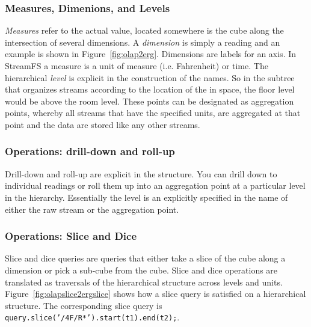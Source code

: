 \subsubsection{Measures, Dimenions, and Levels}
\emph{Measures} refer to the actual value, located somewhere is the cube along the intersection of several dimensions.
A \emph{dimension} is simply a reading and an example is shown in Figure~\ref{fig:olap2erg}.  Dimensions 
are labels for an axis.  In StreamFS a measure is a unit of measure (i.e. Fahrenheit) or time.  The hierarchical \emph{level}
is explicit in the construction of the names.  So in the subtree that organizes streams according to the location of the
in space, the floor level would be above the room level.  These points can be designated as aggregation points, whereby
all streams that have the specified units, are aggregated at that point and the data are stored like any other streams.

\subsubsection{Operations: drill-down and roll-up}
Drill-down and roll-up are explicit in the structure.  You can drill down to individual readings or roll them
up into an aggregation point at a particular level in the hierarchy.  Essentially the level is an explicitly specified in the 
name of either the raw stream or the aggregation point.

\subsubsection{Operations: Slice and Dice}
Slice and dice queries are queries that either take a slice of the cube along a dimension or pick a sub-cube from the cube.
Slice and dice operations are translated as traversals of the hierarchical structure across levels and units.  Figure~\ref{fig:olapslice2ergslice}
shows how a slice query is satisfied on a hierarchical structure.  The corresponding slice query 
is \texttt{query.slice('/4F/R*').start(t1).end(t2);}.

